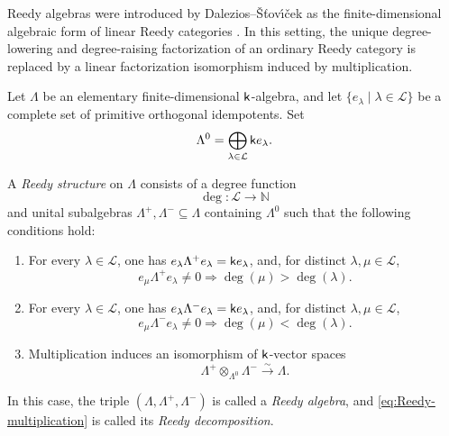 Reedy algebras were introduced by 
Dalezios--\v{S}\v{t}ov\'{\i}\v{c}ek as
the finite-dimensional algebraic form of linear Reedy categories
\cite[Section~4.3]{DS}.  In this setting, the unique degree-lowering and
degree-raising factorization of an ordinary Reedy category is replaced
by a linear factorization isomorphism induced by multiplication.

Let $\Lambda$ be an elementary finite-dimensional $\mathsf{k}$-algebra, and
let $\{e_\lambda\mid\lambda\in\mathcal L\}$ be a complete set of
primitive orthogonal idempotents. Set
\[
\Lambda^0
=
\bigoplus_{\lambda\in\mathcal L}\mathsf{k} e_\lambda.
\]

\begin{definition}[{\cite[Definition~4.17]{DS}}]
A \emph{Reedy structure} on $\Lambda$ consists of a degree function
\[
\deg\colon\mathcal L\longrightarrow\mathbb N
\]
and unital subalgebras $\Lambda^+,\Lambda^-\subseteq\Lambda$ containing
$\Lambda^0$ such that the following conditions hold:
\begin{enumerate}
    \item[\rm (R1)] For every $\lambda\in\mathcal L$, one has
    $e_\lambda\Lambda^+e_\lambda=\mathsf{k} e_\lambda$, and, for distinct
    $\lambda,\mu\in\mathcal L$,
    \begin{equation}
    e_\mu\Lambda^+e_\lambda\neq0
    \Longrightarrow
    \deg(\mu)>\deg(\lambda).
    \label{eq:Reedy-plus-degree}
    \end{equation}

    \item[\rm (R2)] For every $\lambda\in\mathcal L$, one has
    $e_\lambda\Lambda^-e_\lambda=\mathsf{k} e_\lambda$, and, for distinct
    $\lambda,\mu\in\mathcal L$,
    \begin{equation}
    e_\mu\Lambda^-e_\lambda\neq0
    \Longrightarrow
    \deg(\mu)<\deg(\lambda).
    \label{eq:Reedy-minus-degree}
    \end{equation}

    \item[\rm (R3)] Multiplication induces an isomorphism of $\mathsf{k}$-vector spaces
    \begin{equation}
    \Lambda^+\otimes_{\Lambda^0}\Lambda^-
    \xrightarrow{\sim}
    \Lambda.
    \label{eq:Reedy-multiplication}
    \end{equation}
\end{enumerate}
In this case, the triple $(\Lambda,\Lambda^+,\Lambda^-)$ is called a
\emph{Reedy algebra}, and \eqref{eq:Reedy-multiplication} is called its
\emph{Reedy decomposition}.
\end{definition}

